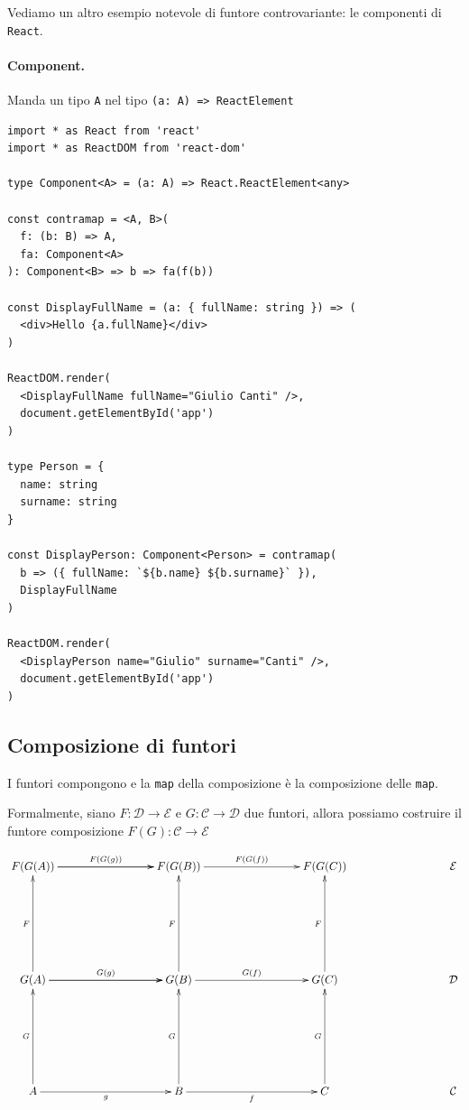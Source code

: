 \documentclass[12pt]{article}
\begin{document}
Vediamo un altro esempio notevole di funtore controvariante: le componenti di \texttt{React}.

\paragraph{Component.}

Manda un tipo \texttt{A} nel tipo \texttt{(a: A) => ReactElement}

\begin{verbatim}
import * as React from 'react'
import * as ReactDOM from 'react-dom'

type Component<A> = (a: A) => React.ReactElement<any>

const contramap = <A, B>(
  f: (b: B) => A,
  fa: Component<A>
): Component<B> => b => fa(f(b))

const DisplayFullName = (a: { fullName: string }) => (
  <div>Hello {a.fullName}</div>
)

ReactDOM.render(
  <DisplayFullName fullName="Giulio Canti" />,
  document.getElementById('app')
)

type Person = {
  name: string
  surname: string
}

const DisplayPerson: Component<Person> = contramap(
  b => ({ fullName: `${b.name} ${b.surname}` }),
  DisplayFullName
)

ReactDOM.render(
  <DisplayPerson name="Giulio" surname="Canti" />,
  document.getElementById('app')
)
\end{verbatim}

\subsection{Composizione di funtori}

I funtori compongono e la \texttt{map} della composizione è la composizione delle \texttt{map}.

Formalmente, siano $F: \mathcal{D} \rightarrow \mathcal{E}$ e $G: \mathcal{C} \rightarrow \mathcal{D}$ due funtori,
allora possiamo costruire il funtore composizione $F(G): \mathcal{C} \rightarrow \mathcal{E}$

\[
\xymatrixrowsep{3cm}
\xymatrixcolsep{3cm}
\xymatrix{
  F(G(A)) \ar[r]^{F(G(g))} \ar[r] & F(G(B)) \ar[r]^{F(G(f))} & F(G(C)) & \mathcal{E} \\
  G(A) \ar[u]^F \ar[r]^{G(g)} \ar[r] & G(B) \ar[u]^F \ar[r]^{G(f)} & G(C) \ar[u]^F & \mathcal{D} \\
  A \ar[u]^G \ar[r]_g & B \ar[u]^G \ar[r]_f & C \ar[u]^G & \mathcal{C}
}
\]
\end{document}
